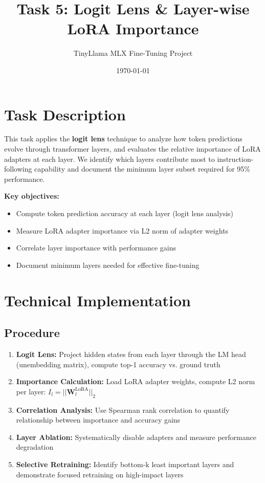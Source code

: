 \documentclass[11pt,a4paper]{article}
\title{\textbf{Task 5: Logit Lens \& Layer-wise LoRA Importance}}
\author{TinyLlama MLX Fine-Tuning Project}
\date{\today}
\begin{document}
\maketitle

\section*{Task Description}
This task applies the \textbf{logit lens} technique to analyze how token predictions evolve through transformer layers, and evaluates the relative importance of LoRA adapters at each layer. We identify which layers contribute most to instruction-following capability and document the minimum layer subset required for 95\% performance.

\textbf{Key objectives:}
\begin{itemize}
    \item Compute token prediction accuracy at each layer (logit lens analysis)
    \item Measure LoRA adapter importance via L2 norm of adapter weights
    \item Correlate layer importance with performance gains
    \item Document minimum layers needed for effective fine-tuning
\end{itemize}

\section*{Technical Implementation}

\subsection*{Procedure}
\begin{enumerate}
    \item \textbf{Logit Lens:} Project hidden states from each layer through the LM head (unembedding matrix), compute top-1 accuracy vs. ground truth
    \item \textbf{Importance Calculation:} Load LoRA adapter weights, compute L2 norm per layer: $I_l = ||\mathbf{W}_l^{\text{LoRA}}||_2$
    \item \textbf{Correlation Analysis:} Use Spearman rank correlation to quantify relationship between importance and accuracy gains
    \item \textbf{Layer Ablation:} Systematically disable adapters and measure performance degradation
    \item \textbf{Selective Retraining:} Identify bottom-k least important layers and demonstrate focused retraining on high-impact layers
\end{enumerate}
\end{document}
